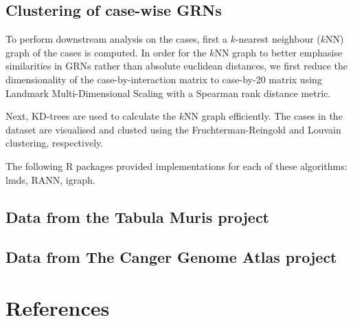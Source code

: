 \subsection{Clustering of case-wise GRNs}
To perform downstream analysis on the cases, first a $k$-nearest neighbour ($k$NN) graph of the cases is computed.
In order for the $k$NN graph to better emphasise similarities in GRNs rather than absolute euclidean distances, we first reduce the dimensionality of the case-by-interaction matrix to case-by-20 matrix using Landmark Multi-Dimensional Scaling\cite{lee_landmarkmdsensemble_2009} with a Spearman rank distance metric.  

Next, KD-trees are used to calculate the $k$NN graph efficiently. The cases in the dataset are visualised and clusted using the Fruchterman-Reingold\cite{fruchterman_graphdrawingforcedirected_1991} and Louvain clustering\cite{blondel_fastunfoldingcommunities_2008}, respectively.

The following R packages provided implementations for each of these algorithms: lmds, RANN, igraph\cite{csardi_igraphsoftwarepackage_2006}.

\subsection{Data from the Tabula Muris project}

\subsection{Data from The Canger Genome Atlas project}

\clearpage
\section{References}
\printbibliography[heading=none]
